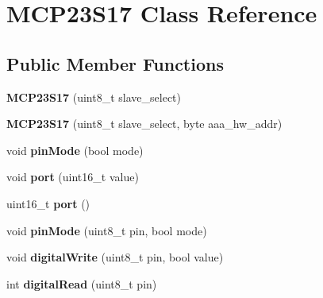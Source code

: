 \hypertarget{classMCP23S17}{\section{M\-C\-P23\-S17 Class Reference}
\label{classMCP23S17}
}
\subsection*{Public Member Functions}
\begin{DoxyCompactItemize}
\item 
\hypertarget{classMCP23S17_a47e81be4746f042f8cf3e8c6c58ad9f8}{{\bfseries M\-C\-P23\-S17} (uint8\-\_\-t slave\-\_\-select)}\label{classMCP23S17_a47e81be4746f042f8cf3e8c6c58ad9f8}

\item 
\hypertarget{classMCP23S17_ab9c8589b93f55157d435265225adec41}{{\bfseries M\-C\-P23\-S17} (uint8\-\_\-t slave\-\_\-select, byte aaa\-\_\-hw\-\_\-addr)}\label{classMCP23S17_ab9c8589b93f55157d435265225adec41}

\item 
\hypertarget{classMCP23S17_a5ee683f0730a23417ecee5bf9c812ea1}{void {\bfseries pin\-Mode} (bool mode)}\label{classMCP23S17_a5ee683f0730a23417ecee5bf9c812ea1}

\item 
\hypertarget{classMCP23S17_a6e0f45191fd20c584f4e8780ba3d75c5}{void {\bfseries port} (uint16\-\_\-t value)}\label{classMCP23S17_a6e0f45191fd20c584f4e8780ba3d75c5}

\item 
\hypertarget{classMCP23S17_a4dac8c3835c31757b951a693d89aa14d}{uint16\-\_\-t {\bfseries port} ()}\label{classMCP23S17_a4dac8c3835c31757b951a693d89aa14d}

\item 
\hypertarget{classMCP23S17_a58044c38e93ac371e3a1697d6bc6265f}{void {\bfseries pin\-Mode} (uint8\-\_\-t pin, bool mode)}\label{classMCP23S17_a58044c38e93ac371e3a1697d6bc6265f}

\item 
\hypertarget{classMCP23S17_ae5a682bcd30f962bc7b40531d568441a}{void {\bfseries digital\-Write} (uint8\-\_\-t pin, bool value)}\label{classMCP23S17_ae5a682bcd30f962bc7b40531d568441a}

\item 
\hypertarget{classMCP23S17_a09738975e423ab784c8ea46b24ea0109}{int {\bfseries digital\-Read} (uint8\-\_\-t pin)}\label{classMCP23S17_a09738975e423ab784c8ea46b24ea0109}

\end{DoxyCompactItemize}
